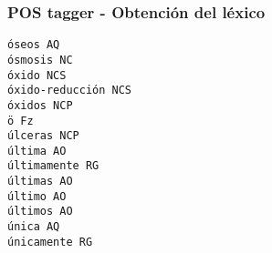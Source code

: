 \documentclass{beamer}
\begin{document}
\begin{frame}[fragile]
\frametitle{POS tagger - Obtención del léxico}
\begin{scriptsize}


\begin{example}[Léxico]

\begin{verbatim}
óseos AQ
ósmosis NC
óxido NCS
óxido-reducción NCS
óxidos NCP
ö Fz
úlceras NCP
última AO
últimamente RG
últimas AO
último AO
últimos AO
única AQ
únicamente RG
\end{verbatim}
\end{example}
\end{scriptsize}
            

\end{frame}
\end{document}

